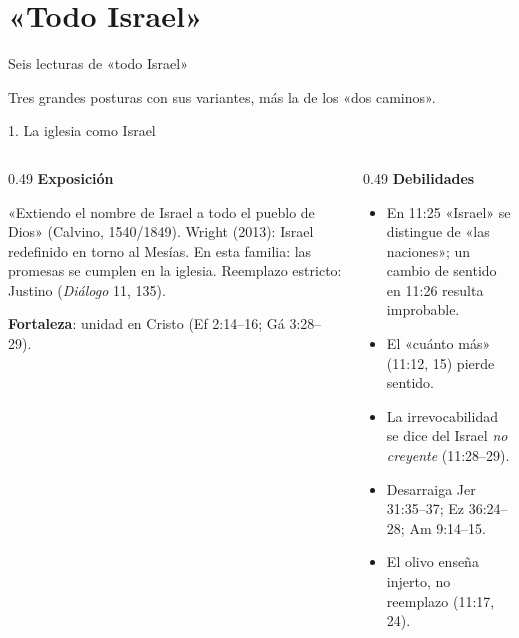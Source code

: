 \documentclass[hyperref={bookmarks=false},aspectratio=169]{beamer}
\newcommand{\notafig}[1]{\par\vspace{2pt}{\fontsize{5}{6}\selectfont\color{sepia}\hfill\textit{Nota.} #1\par}}
\newcommand{\elabpropia}{\notafig{Elaboración propia.}}
\begin{document}
\section{«Todo Israel»}
\begin{frame}{Seis lecturas de «todo Israel»}
\centering
{}\par
\elabpropia\vspace{4pt}
{\small Tres grandes posturas con sus variantes, más la de los «dos caminos».}
\end{frame}

\begin{frame}{1. La iglesia como Israel}
\begin{columns}[T,onlytextwidth]
\begin{column}{0.49\textwidth}\small\RaggedRight
\textbf{\textcolor{cafe}{Exposición}}\par
«Extiendo el nombre de Israel a todo el pueblo de Dios» (Calvino, 1540/1849). Wright (2013): Israel redefinido en torno al Mesías. En esta familia: las promesas se cumplen en la iglesia. Reemplazo estricto: Justino (\emph{Diálogo} 11, 135).\par\smallskip
\textbf{\textcolor{cafe}{Fortaleza}}: unidad en Cristo (Ef 2:14--16; Gá 3:28--29).
\end{column}
\begin{column}{0.49\textwidth}\scriptsize\RaggedRight
\textbf{\textcolor{ladrillo}{Debilidades}}
\begin{itemize}
\item En 11:25 «Israel» se distingue de «las naciones»; un cambio de sentido en 11:26 resulta improbable.
\item El «cuánto más» (11:12, 15) pierde sentido.
\item La irrevocabilidad se dice del Israel \emph{no creyente} (11:28--29).
\item Desarraiga Jer 31:35--37; Ez 36:24--28; Am 9:14--15.
\item El olivo enseña injerto, no reemplazo (11:17, 24).
\end{itemize}
\end{column}
\end{columns}
\end{frame}
\end{document}
